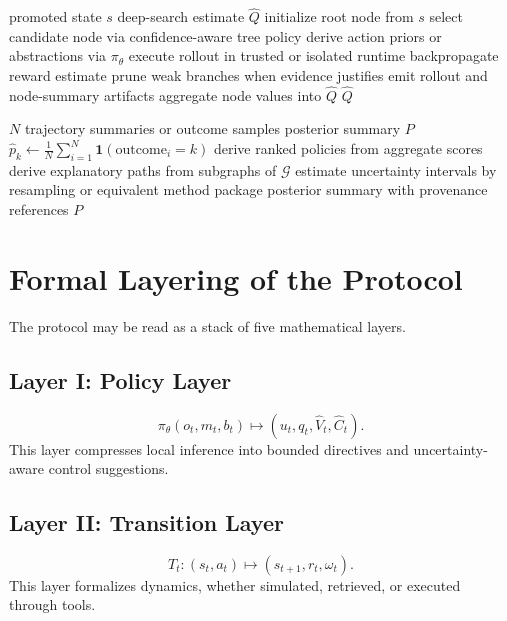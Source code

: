 \documentclass[11pt]{article}
\theoremstyle{definition}
\newcommand{\graph}{\mathcal{G}}
\begin{document}
\begin{algorithm}[h]
\caption{Deep Search}
\begin{algorithmic}[1]
\Require promoted state \(s\)
\Ensure deep-search estimate \(\hat{Q}\)
\State initialize root node from \(s\)
    \State select candidate node via confidence-aware tree policy
    \State derive action priors or abstractions via \(\pi_\theta\)
    \State execute rollout in trusted or isolated runtime
    \State backpropagate reward estimate
    \State prune weak branches when evidence justifies
    \State emit rollout and node-summary artifacts
\EndWhile
\State aggregate node values into \(\hat{Q}\)
\State \Return \(\hat{Q}\)
\end{algorithmic}
\end{algorithm}

\begin{algorithm}[h]
\caption{Posterior Collapse}
\begin{algorithmic}[1]
\Require \(N\) trajectory summaries or outcome samples
\Ensure posterior summary \(P\)
    \State \(\hat{p}_k \gets \frac{1}{N}\sum_{i=1}^N \mathbf{1}(\mathrm{outcome}_i = k)\)
\EndFor
\State derive ranked policies from aggregate scores
\State derive explanatory paths from subgraphs of \(\graph\)
\State estimate uncertainty intervals by resampling or equivalent method
\State package posterior summary with provenance references
\State \Return \(P\)
\end{algorithmic}
\end{algorithm}

\section{Formal Layering of the Protocol}

The protocol may be read as a stack of five mathematical layers.

\subsection{Layer I: Policy Layer}
\[
\pi_\theta(o_t,m_t,b_t)\mapsto(u_t,q_t,\hat V_t,\hat C_t).
\]
This layer compresses local inference into bounded directives and uncertainty-aware control suggestions.

\subsection{Layer II: Transition Layer}
\[
T_t:(s_t,a_t)\mapsto(s_{t+1},r_t,\omega_t).
\]
This layer formalizes dynamics, whether simulated, retrieved, or executed through tools.
\end{document}
